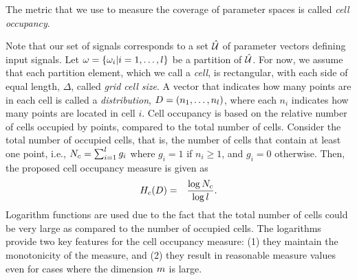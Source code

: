 The metric that we use to measure the coverage of parameter spaces is called {\em cell occupancy}. 

%

Note that our set of signals corresponds to a set $\hat{\mathcal{U}}$ of parameter vectors defining input signals.
Let $\omega=\{ \omega_i | i=1,\ldots,
l \}$ be a partition of $\hat{\mathcal{U}}$. For now, we assume that each partition element,
which we call a \emph{cell}, is rectangular, with each side of equal
length, $\Delta$, called \emph{grid cell size}. A
vector that indicates how many points are in each cell is called a
\emph{distribution}, $D=(n_1,\ldots,n_l)$,
where each $n_i$ indicates how many points are located in cell $i$.
Cell occupancy is based on the relative number of cells occupied by
points, compared to the total number of cells. Consider the total
number of occupied cells, that is, the number of cells that contain
at least one point, i.e., $N_c =  \sum_{i=1}^{l} g_i$  
where $g_i = 1$ if  $n_i\geq 1$, and $g_i = 0$ otherwise. Then, the proposed cell occupancy measure is given as
\begin{eqnarray*}
H_c(D) & = & \frac{\log N_c}{\log l}.
\end{eqnarray*}
Logarithm functions are used due to the fact that the total number of cells could be very large as compared to the number of occupied cells. The logarithms provide two key features for the cell occupancy measure: (1) they maintain the monotonicity of the measure, and (2) they result in reasonable measure values even for cases where the dimension $m$ is  large.  

